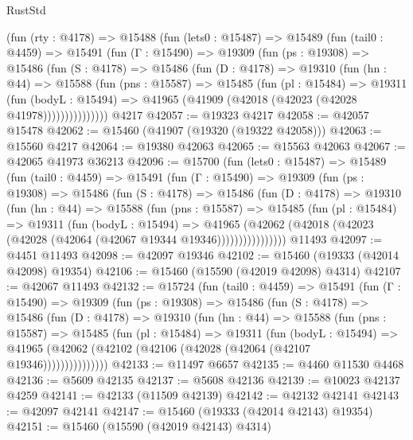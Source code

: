 \begin{lexlean}{RustStd}
\begin{coremodule}
    (fun (rty : @4178) =>
    @15488
      (fun (lets0 : @15487) =>
      @15489
        (fun (tail0 : @4459) =>
        @15491
          (fun (Γ : @15490) =>
          @19309
            (fun (ps : @19308) =>
            @15486
              (fun (S : @4178) =>
              @15486
                (fun (D : @4178) =>
                @19310
                  (fun (hn : @44) =>
                  @15588
                    (fun (pns : @15587) =>
                    @15485
                      (fun (pl : @15484) =>
                      @19311
                        (fun (bodyL : @15494) =>
                        @41965 (@41909 (@42018 (@42023 (@42028 @41978)))))))))))))))
    @4217
@42057 := @19323 @4217
@42058 := @42057 @15478
@42062 := @15460 (@41907 (@19320 (@19322 @42058)))
@42063 := @15560 @4217
@42064 := @19380 @42063
@42065 := @15563 @42063
@42067 := @42065 @41973 @36213
@42096 := @15700
    (fun (lets0 : @15487) =>
    @15489
      (fun (tail0 : @4459) =>
      @15491
        (fun (Γ : @15490) =>
        @19309
          (fun (ps : @19308) =>
          @15486
            (fun (S : @4178) =>
            @15486
              (fun (D : @4178) =>
              @19310
                (fun (hn : @44) =>
                @15588
                  (fun (pns : @15587) =>
                  @15485
                    (fun (pl : @15484) =>
                    @19311
                      (fun (bodyL : @15494) =>
                      @41965
                        (@42062
                          (@42018 (@42023 (@42028 (@42064 (@42067 @19344 @19346))))))))))))))))
    @11493
@42097 := @4451 @11493
@42098 := @42097 @19346
@42102 := @15460 (@19333 (@42014 @42098) @19354)
@42106 := @15460 (@15590 (@42019 @42098) @4314)
@42107 := @42067 @11493
@42132 := @15724
    (fun (tail0 : @4459) =>
    @15491
      (fun (Γ : @15490) =>
      @19309
        (fun (ps : @19308) =>
        @15486
          (fun (S : @4178) =>
          @15486
            (fun (D : @4178) =>
            @19310
              (fun (hn : @44) =>
              @15588
                (fun (pns : @15587) =>
                @15485
                  (fun (pl : @15484) =>
                  @19311
                    (fun (bodyL : @15494) =>
                    @41965 (@42062 (@42102 (@42106 (@42028 (@42064 (@42107 @19346)))))))))))))))
@42133 := @11497 @6657
@42135 := @4460 @11530 @4468
@42136 := @5609 @42135
@42137 := @5608 @42136
@42139 := @10023 @42137 @4259
@42141 := @42133 (@11509 @42139)
@42142 := @42132 @42141
@42143 := @42097 @42141
@42147 := @15460 (@19333 (@42014 @42143) @19354)
@42151 := @15460 (@15590 (@42019 @42143) @4314)

\end{coremodule}
\end{lexlean}
